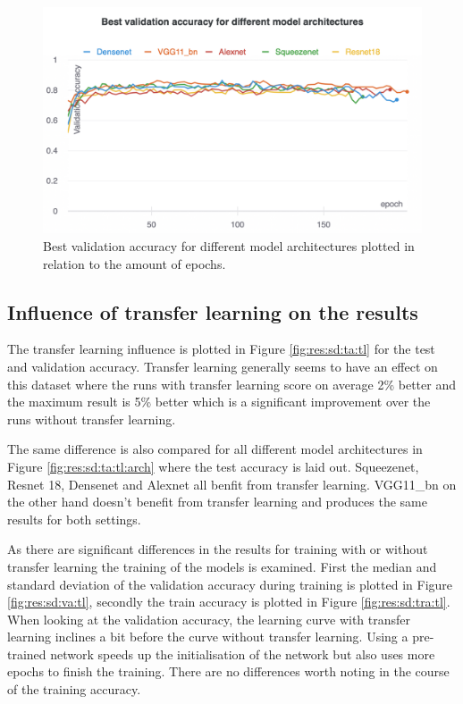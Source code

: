 	\begin{figure}[hbtp]
	\centering
	\includegraphics[width=0.6\linewidth]{fig/results/wandb/spaghetti_dataset/charts/Section-13-Panel-0-yf0a5rsos}
	\caption{Best validation accuracy for different model architectures plotted in relation to the amount of epochs.}
	\label{fig:results:spaghetti:architectures:valacc}
	\end{figure}

	\subsection{Influence of transfer learning on the results}
		The transfer learning influence is plotted in Figure \ref{fig:res:sd:ta:tl} for the test and validation accuracy. Transfer learning generally seems to have an effect on this dataset where the runs with transfer learning score on average 2\% better and the maximum result is 5\% better which is a significant improvement over the runs without transfer learning. 
		
		The same difference is also compared for all different model architectures in Figure \ref{fig:res:sd:ta:tl:arch} where the test accuracy is laid out. Squeezenet, Resnet 18, Densenet and Alexnet all benfit from transfer learning. VGG11\_bn on the other hand doesn't benefit from transfer learning and produces the same results for both settings.
		
		As there are significant differences in the results for training with or without transfer learning the training of the models is examined. First the median and standard deviation of the validation accuracy during training is plotted in Figure \ref{fig:res:sd:va:tl}, secondly the train accuracy is plotted in Figure \ref{fig:res:sd:tra:tl}. 
		When looking at the validation accuracy, the learning curve with transfer learning inclines a bit before the curve without transfer learning. Using a pre-trained network speeds up the initialisation of the network but also uses more epochs to finish the training. There are no differences worth noting in the course of the training accuracy.

